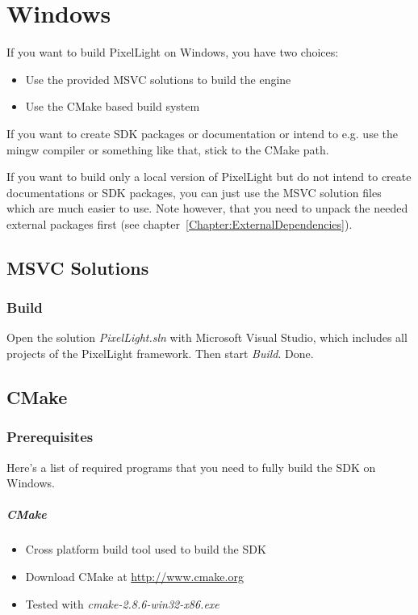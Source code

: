\chapter{Windows}
If you want to build PixelLight on Windows, you have two choices:
\begin{itemize}
\item{Use the provided \ac{MSVC} solutions to build the engine}
\item{Use the CMake based build system}
\end{itemize}

If you want to create \ac{SDK} packages or documentation or intend to e.g. use the mingw compiler or something like that, stick to the CMake path.

If you want to build only a local version of PixelLight but do not intend to create documentations or \ac{SDK} packages, you can just use the \ac{MSVC} solution files which are much easier to use. Note however, that you need to unpack the needed external packages first (see chapter~\ref{Chapter:ExternalDependencies}).





\section{\ac{MSVC} Solutions}



\subsection{Build}
Open the solution \emph{PixelLight.sln} with Microsoft Visual Studio, which includes all projects of the PixelLight framework. Then start \emph{Build}. Done.




\section{CMake}



\subsection{Prerequisites}
Here's a list of required programs that you need to fully build the \ac{SDK} on Windows.


\paragraph{CMake}
\begin{itemize}
\item{Cross platform build tool used to build the \ac{SDK}}
\item{Download CMake at \url{http://www.cmake.org}}
\item{Tested with \emph{cmake-2.8.6-win32-x86.exe}}
\end{itemize}


